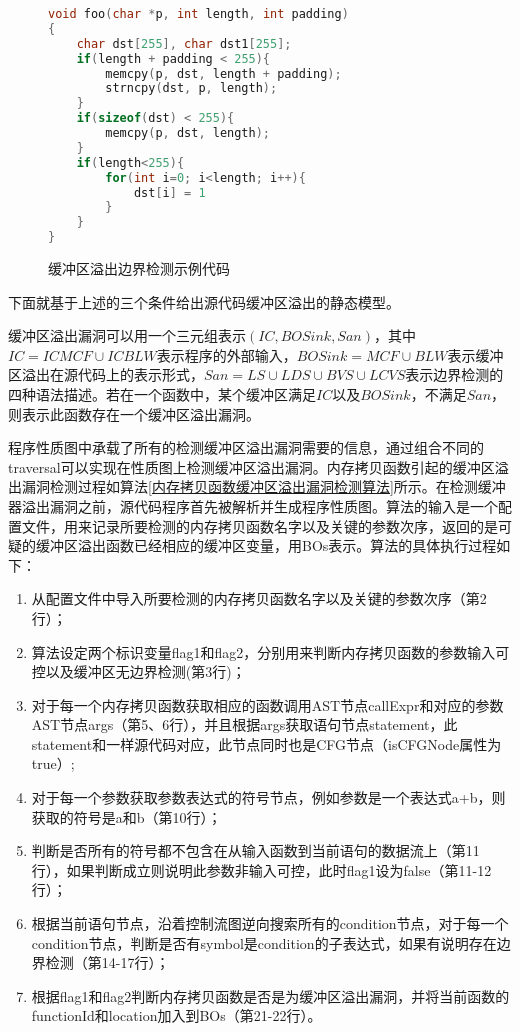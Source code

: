 {\begin{figure}[h]
\begin{lstlisting}[language=C]
void foo(char *p, int length, int padding)
{
	char dst[255], char dst1[255];
	if(length + padding < 255){
		memcpy(p, dst, length + padding);
		strncpy(dst, p, length);
	}
	if(sizeof(dst) < 255){
		memcpy(p, dst, length);
	}
	if(length<255){
		for(int i=0; i<length; i++){
			dst[i] = 1
		}
	}
}
\end{lstlisting}
\caption{缓冲区溢出边界检测示例代码}
\label{缓冲区溢出边界检测示例代码}
\end{figure}


下面就基于上述的三个条件给出源代码缓冲区溢出的静态模型。
\begin{definition}
\label{缓冲区溢出定义}
缓冲区溢出漏洞可以用一个三元组表示$(IC, BOSink, San)$，其中$IC = ICMCF \cup ICBLW$表示程序的外部输入，$BOSink = MCF \cup BLW$表示缓冲区溢出在源代码上的表示形式，$San = LS \cup LDS \cup BVS \cup LCVS$表示边界检测的四种语法描述。若在一个函数中，某个缓冲区满足$IC$以及$BOSink$，不满足$San$，则表示此函数存在一个缓冲区溢出漏洞。
\end{definition}


程序性质图中承载了所有的检测缓冲区溢出漏洞需要的信息，通过组合不同的traversal可以实现在性质图上检测缓冲区溢出漏洞。内存拷贝函数引起的缓冲区溢出漏洞检测过程如算法\ref{内存拷贝函数缓冲区溢出漏洞检测算法}所示。在检测缓冲器溢出漏洞之前，源代码程序首先被解析并生成程序性质图。算法的输入是一个配置文件，用来记录所要检测的内存拷贝函数名字以及关键的参数次序，返回的是可疑的缓冲区溢出函数已经相应的缓冲区变量，用BOs表示。算法的具体执行过程如下：

\begin{enumerate}[(1)]
\item 
从配置文件中导入所要检测的内存拷贝函数名字以及关键的参数次序（第2行）；
\item
算法设定两个标识变量flag1和flag2，分别用来判断内存拷贝函数的参数输入可控以及缓冲区无边界检测(第3行)；
\item
对于每一个内存拷贝函数获取相应的函数调用AST节点callExpr和对应的参数AST节点args（第5、6行），并且根据args获取语句节点statement，此statement和一样源代码对应，此节点同时也是CFG节点（isCFGNode属性为true）;
\item 
对于每一个参数获取参数表达式的符号节点，例如参数是一个表达式a+b，则获取的符号是a和b（第10行）；
\item 
判断是否所有的符号都不包含在从输入函数到当前语句的数据流上（第11行），如果判断成立则说明此参数非输入可控，此时flag1设为false（第11-12行）；
\item 
根据当前语句节点，沿着控制流图逆向搜索所有的condition节点，对于每一个condition节点，判断是否有symbol是condition的子表达式，如果有说明存在边界检测（第14-17行）；
\item 根据flag1和flag2判断内存拷贝函数是否是为缓冲区溢出漏洞，并将当前函数的functionId和location加入到BOs（第21-22行）。
\end{enumerate}

}
